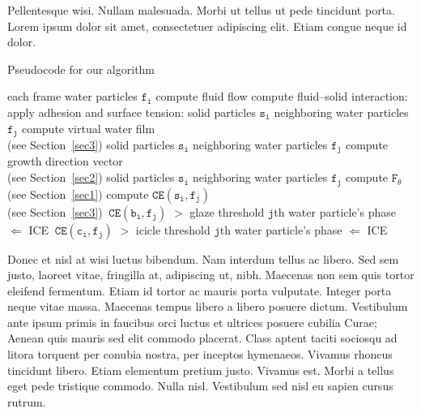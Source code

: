 \documentclass[CJCE,STIX2COL]{WileyNJD-v2}
\begin{document}
Pellentesque wisi. Nullam malesuada. Morbi ut tellus ut pede tincidunt porta. Lorem ipsum dolor sit amet,
consectetuer adipiscing elit. Etiam congue neque id dolor.

\begin{algorithm}[t]
\caption{Pseudocode for our algorithm}\label{alg1}
\begin{algorithmic}
  \For each frame
  \For water particles $\texttt{f}_{\texttt{i}}$
  \State compute fluid flow
  \State compute fluid--solid interaction\cite{Boggs2002}:
  \State apply adhesion and surface tension\cite{Yoo2007}:
  \EndFor
   \For solid particles $\texttt{s}_{\texttt{i}}$
   \For neighboring water particles $\texttt{f}_{\texttt{j}}$
   \State compute virtual water film \\(see Section~\ref{sec3})
   \EndFor
   \EndFor
   \For solid particles $\texttt{s}_{\texttt{i}}$
   \For neighboring water particles $\texttt{f}_{\texttt{j}}$
   \State compute growth direction vector \\(see Section~\ref{sec2})
   \EndFor
   \EndFor
   \For solid particles $\texttt{s}_{\texttt{i}}$
   \For neighboring water particles $\texttt{f}_{\texttt{j}}$
   \State compute $\texttt{F}_{\theta}$ (see Section~\ref{sec1})
   \State compute $\texttt{CE}(\texttt{s}_{\texttt{i}},\texttt{f}_{\texttt{j}})$ \\(see Section~\ref{sec3})
   \If $\ \texttt{CE}(\texttt{b}_{\texttt{i}}, \texttt{f}_{\texttt{j}})$ $>$ glaze threshold
   \State $\texttt{j}$th water particle's phase $\Leftarrow$ ICE
   \EndIf
   \If $\ \texttt{CE}(\texttt{c}_{\texttt{i}}, \texttt{f}_{\texttt{j}})$ $>$ icicle threshold
   \State $\texttt{j}$th water particle's phase $\Leftarrow$ ICE
   \EndIf
   \EndFor
   \EndFor
  \EndFor
\end{algorithmic}
\end{algorithm}

Donec et nisl at wisi luctus bibendum. Nam interdum tellus ac libero. Sed sem justo, laoreet vitae, fringilla at,
adipiscing ut, nibh. Maecenas non sem quis tortor eleifend fermentum. Etiam id tortor ac mauris porta vulputate.
Integer porta neque vitae massa. Maecenas tempus libero a libero posuere dictum. Vestibulum ante ipsum primis in
faucibus orci luctus et ultrices posuere cubilia Curae; Aenean quis mauris sed elit commodo placerat. Class aptent
taciti sociosqu ad litora torquent per conubia nostra, per inceptos hymenaeos. Vivamus rhoncus tincidunt libero.
Etiam elementum pretium justo. Vivamus est. Morbi a tellus eget pede tristique commodo. Nulla nisl. Vestibulum
sed nisl eu sapien cursus rutrum.
\end{document}
